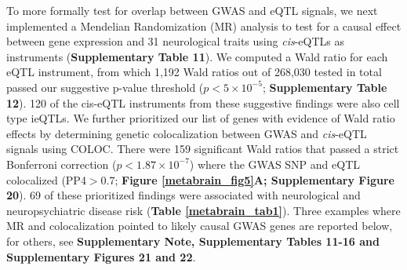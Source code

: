 To more formally test for overlap between GWAS and eQTL signals, we next implemented a Mendelian Randomization (MR) analysis to test for a causal effect between gene expression and 31 neurological traits using \textit{cis}-eQTLs as instruments (\textbf{Supplementary Table 11}). We computed a Wald ratio for each eQTL instrument, from which 1,192 Wald ratios out of 268,030 tested in total passed our suggestive p-value threshold ($p<5 \times 10^{-5}$; \textbf{Supplementary Table 12}). 120 of the cis-eQTL instruments from these suggestive findings were also cell type ieQTLs. We further prioritized our list of genes with evidence of Wald ratio effects by determining genetic colocalization between GWAS and \textit{cis}-eQTL signals using COLOC\cite{deelenGenotypeHarmonizerAutomatic2014}. There were 159 significant Wald ratios that passed a strict Bonferroni correction ($p<1.87 \times 10^{-7}$) where the GWAS SNP and eQTL colocalized (PP4$>$0.7; \textbf{Figure \ref{metabrain_fig5}A; Supplementary Figure 20}). 69 of these prioritized findings were associated with neurological and neuropsychiatric disease risk (\textbf{Table \ref{metabrain_tab1}}). Three examples where MR and colocalization pointed to likely causal GWAS genes are reported below, for others, see \textbf{Supplementary Note, Supplementary Tables 11-16 and Supplementary Figures 21 and 22}.

